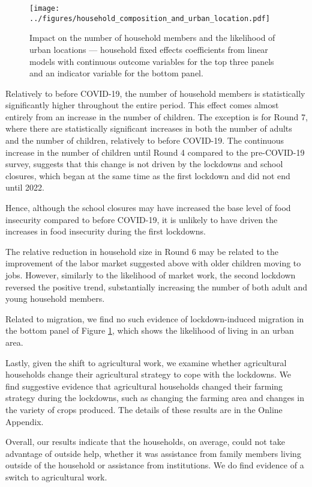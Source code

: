 \documentclass{wber}
\begin{document}
\begin{figure}
\centering
\texttt{[image: ../figures/household\_composition\_and\_urban\_location.pdf]}
\caption{Impact on the number of household members and the likelihood of
urban locations --- household fixed effects coefficients from linear
models with continuous outcome variables for the top three panels and an
indicator variable for the bottom panel.}\label{fig:members_location}
\end{figure}

Relatively to before COVID-19, the number of household members is
statistically significantly higher throughout the entire period. This
effect comes almost entirely from an increase in the number of children.
The exception is for Round 7, where there are statistically significant
increases in both the number of adults and the number of children,
relatively to before COVID-19. The continuous increase in the number of
children until Round 4 compared to the pre-COVID-19 survey, suggests
that this change is not driven by the lockdowns and school closures,
which began at the same time as the first lockdown and did not end until
2022.

Hence, although the school closures may have increased the base level of
food insecurity compared to before COVID-19, it is unlikely to have
driven the increases in food insecurity during the first lockdowns.

The relative reduction in household size in Round 6 may be related to
the improvement of the labor market suggested above with older children
moving to jobs. However, similarly to the likelihood of market work, the
second lockdown reversed the positive trend, substantially increasing
the number of both adult and young household members.

Related to migration, we find no such evidence of lockdown-induced
migration in the bottom panel of Figure \ref{fig:members_location}, which
shows the likelihood of living in an urban area.

Lastly, given the shift to agricultural work, we examine whether
agricultural households change their agricultural strategy to cope with
the lockdowns. We find suggestive evidence that agricultural households
changed their farming strategy during the lockdowns, such as changing
the farming area and changes in the variety of crops produced. 
The details of these results are in the Online Appendix.

Overall, our results indicate that the households, on average, could not
take advantage of outside help, whether it was assistance from family
members living outside of the household or assistance from institutions.
We do find evidence of a switch to agricultural work.
\end{document}
